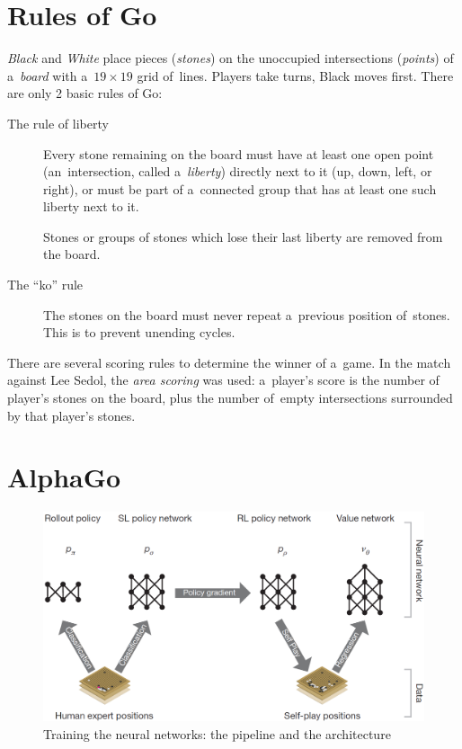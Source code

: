 \documentclass[a4paper,10pt]{article}
\begin{document}
\section{Rules of Go}
\emph{Black} and \emph{White} place pieces (\emph{stones}) on the unoccupied intersections (\emph{points}) of a~\emph{board} with a~$19\times19$ grid of~lines.
Players take turns, Black moves first.
There are only 2 basic rules of Go:
\begin{description}
  \item [The rule of liberty]
    Every stone remaining on the board must have at least one open point (an~intersection, called a~\emph{liberty}) directly next to it (up, down, left, or right), or must be part of a~connected group that has at least one such liberty next to it.

    Stones or groups of stones which lose their last liberty are removed from the board.

  \item [The ``ko'' rule]
    The stones on the board must never repeat a~previous position of~stones.
    This is to prevent unending cycles.
\end{description}

There are several scoring rules to determine the winner of a~game.
In the match against Lee Sedol, the \emph{area scoring} was used:
a~player's score is the number of player's stones on the board, plus the number of~empty intersections surrounded by that player's stones.

\section{AlphaGo}
\begin{figure}[H]
  \centering
  \includegraphics[width=.7\textwidth]{../img/neural_nets_pipeline.png}
  \caption{Training the neural networks: the pipeline and the architecture}
  \label{fig:neural_nets_pipeline}
\end{figure}
\end{document}
